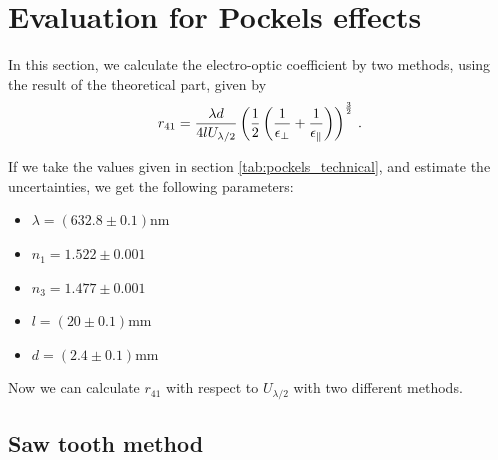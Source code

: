 \section{Evaluation for Pockels effects}
In this section, we calculate the electro-optic coefficient 
by two methods, using the result of the theoretical part, given by
\begin{equation}
    r_{41} = \frac{\lambda d}{4 l U_{\lambda / 2}} 
    \left(\frac{1}{2} \left(\frac{1}{\epsilon_\perp} + \frac{1}{\epsilon_\parallel}\right)\right)^{\frac{3}{2}}\, .
    \label{eq:r_41_U}
\end{equation}

If we take the values given in section \ref{tab:pockels_technical}, 
and estimate the uncertainties, we get the following parameters:
\begin{itemize}
\setlength\itemsep{0em}
\item[] $\lambda = (632.8\pm 0.1)$nm
\item[] $n_1     = 1.522\pm 0.001$
\item[] $n_3     = 1.477\pm 0.001$
\item[] $l       = ( 20\pm 0.1)$mm
\item[] $d       = (2.4\pm 0.1)$mm
\end{itemize}

Now we can calculate $r_{41}$ with respect to $U_{\lambda/2}$ with two different methods.

\subsection{Saw tooth method}
\label{ssub:Saw tooth method}

